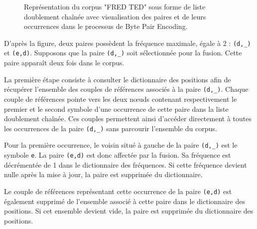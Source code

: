\documentclass[12pt,a4paper]{report}
\begin{document}
\begin{figure}[h]
	\caption{Représentation du corpus "FRED TED" sous forme de liste doublement chaînée avec visualisation des paires et de leurs occurrences dans le processus de Byte Pair Encoding.}
	\label{fig:corpus_bpe}
	\end{figure}
		D’après la figure, deux paires possèdent la fréquence maximale, égale à 2 : \texttt{(d,\_)} et \texttt{(e,d)}. Supposons que la paire \texttt{(d,\_)} soit sélectionnée pour la fusion. Cette paire apparaît deux fois dans le corpus.
		
		La première étape consiste à consulter le dictionnaire des positions afin de récupérer l’ensemble des couples de références associés à la paire \texttt{(d,\_)}. Chaque couple de références pointe vers les deux nœuds contenant respectivement le premier et le second symbole d’une occurrence de cette paire dans la liste doublement chaînée. Ces couples permettent ainsi d’accéder directement à toutes les occurrences de la paire \texttt{(d,\_)} sans parcourir l’ensemble du corpus.
		
		Pour la première occurrence, le voisin situé à gauche de la paire \texttt{(d,\_)} est le symbole \texttt{e}. La paire \texttt{(e,d)} est donc affectée par la fusion. Sa fréquence est décrémentée de 1 dans le dictionnaire des fréquences. Si cette fréquence devient nulle après la mise à jour, la paire est supprimée du dictionnaire.
		
		Le couple de références représentant cette occurrence de la paire \texttt{(e,d)} est également supprimé de l’ensemble associé à cette paire dans le dictionnaire des positions. Si cet ensemble devient vide, la paire est supprimée du dictionnaire des positions.
		
\end{document}

